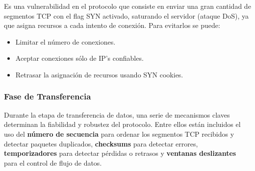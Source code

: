 \begin{onepage}
\begin{tcolorbox}[
title=SYN Flood,
colback=blue!5!white,
colframe=blue!75!black,
fonttitle=\bfseries]
Es una vulnerabilidad en el protocolo que consiste en enviar una gran cantidad de segmentos TCP con el flag SYN activado, saturando el servidor (ataque DoS), ya que asigna recursos a cada intento de conexión. Para evitarlos se puede:
\begin{itemize}
    \item Limitar el número de conexiones.
    \item Aceptar conexiones sólo de IP’s confiables.
    \item Retrasar la asignación de recursos usando SYN cookies.
\end{itemize}
\end{tcolorbox}
\end{onepage}
\subsubsection{Fase de Transferencia}
Durante la etapa de transferencia de datos, una serie de mecanismos claves determinan la fiabilidad y robustez del protocolo. Entre ellos están incluidos el uso del \textbf{número de secuencia} para ordenar los segmentos TCP recibidos y detectar paquetes duplicados, \textbf{checksums} para detectar errores, \textbf{temporizadores} para detectar pérdidas o retrasos y \textbf{ventanas deslizantes} para el control de flujo de datos.

